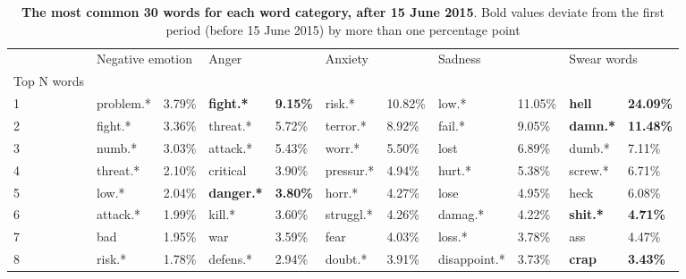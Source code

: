 \begin{table}[h]\centering
\caption{\textbf{The most common 30 words for each word category, after 15 June 2015}. Bold values deviate from the first period (before 15 June 2015) by more than one percentage point}
	\label{fig: after_1}
\begin{adjustbox}{width=\linewidth, center}
	\begin{tabular}{lllllllllll}
	\toprule
	{} & \multicolumn{2}{l}{Negative emotion} & \multicolumn{2}{l}{Anger} & \multicolumn{2}{l}{Anxiety} & \multicolumn{2}{l}{Sadness} & \multicolumn{2}{l}{Swear words} \\
	Top N words          &                  &            &                    &                  &              &            &               &            &                  &                   \\
	\midrule
	1                    &        problem.* &     3.79\% &   \textbf{fight.*} &  \textbf{9.15\%} &       risk.* &    10.82\% &         low.* &    11.05\% &    \textbf{hell} &  \textbf{24.09\%} \\
	2                    &          fight.* &     3.36\% &           threat.* &           5.72\% &     terror.* &     8.92\% &        fail.* &     9.05\% &  \textbf{damn.*} &  \textbf{11.48\%} \\
	3                    &           numb.* &     3.03\% &           attack.* &           5.43\% &       worr.* &     5.50\% &          lost &     6.89\% &           dumb.* &            7.11\% \\
	4                    &         threat.* &     2.10\% &           critical &           3.90\% &    pressur.* &     4.94\% &        hurt.* &     5.38\% &          screw.* &            6.71\% \\
	5                    &            low.* &     2.04\% &  \textbf{danger.*} &  \textbf{3.80\%} &       horr.* &     4.27\% &          lose &     4.95\% &             heck &            6.08\% \\
	6                    &         attack.* &     1.99\% &             kill.* &           3.60\% &    struggl.* &     4.26\% &       damag.* &     4.22\% &  \textbf{shit.*} &   \textbf{4.71\%} \\
	7                    &              bad &     1.95\% &                war &           3.59\% &         fear &     4.03\% &        loss.* &     3.78\% &              ass &            4.47\% \\
	8                    &           risk.* &     1.78\% &           defens.* &           2.94\% &      doubt.* &     3.91\% &  disappoint.* &     3.73\% &    \textbf{crap} &   \textbf{3.43\%} \\

\end{tabular}
\end{adjustbox}
\end{table}
